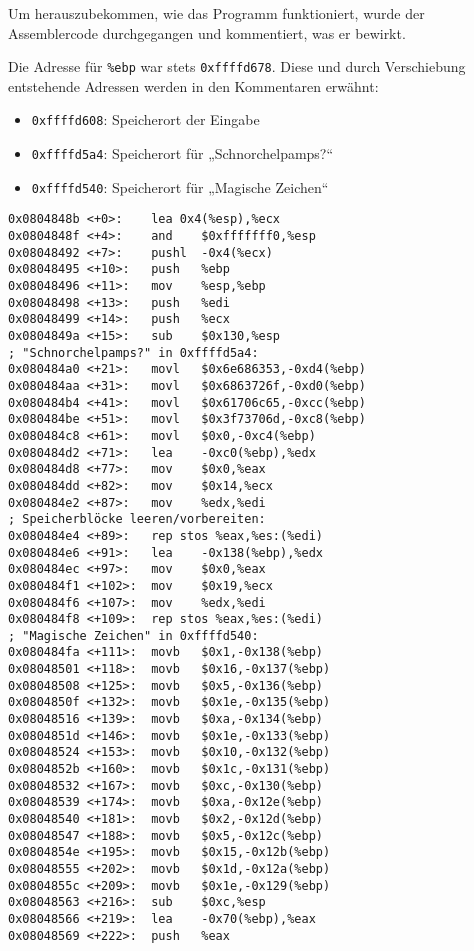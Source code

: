 \documentclass{scrartcl}
\begin{document}
Um herauszubekommen, wie das Programm funktioniert, wurde der Assemblercode durchgegangen und kommentiert, was er bewirkt.

Die Adresse für \lstinline`%ebp` war stets \lstinline`0xffffd678`. Diese und durch Verschiebung entstehende Adressen werden in den Kommentaren erwähnt:
\begin{itemize}
\item \lstinline`0xffffd608`: Speicherort der Eingabe
\item \lstinline`0xffffd5a4`: Speicherort für „Schnorchelpamps?“
\item \lstinline`0xffffd540`: Speicherort für „Magische Zeichen“
\end{itemize}
\begin{lstlisting}[language={[x86masm]Assembler}]
0x0804848b <+0>:	lea 0x4(%esp),%ecx
0x0804848f <+4>:	and    $0xfffffff0,%esp
0x08048492 <+7>:	pushl  -0x4(%ecx)
0x08048495 <+10>:	push   %ebp
0x08048496 <+11>:	mov    %esp,%ebp
0x08048498 <+13>:	push   %edi
0x08048499 <+14>:	push   %ecx
0x0804849a <+15>:	sub    $0x130,%esp
; "Schnorchelpamps?" in 0xffffd5a4:
0x080484a0 <+21>:	movl   $0x6e686353,-0xd4(%ebp)
0x080484aa <+31>:	movl   $0x6863726f,-0xd0(%ebp)
0x080484b4 <+41>:	movl   $0x61706c65,-0xcc(%ebp)
0x080484be <+51>:	movl   $0x3f73706d,-0xc8(%ebp)
0x080484c8 <+61>:	movl   $0x0,-0xc4(%ebp)
0x080484d2 <+71>:	lea    -0xc0(%ebp),%edx
0x080484d8 <+77>:	mov    $0x0,%eax
0x080484dd <+82>:	mov    $0x14,%ecx
0x080484e2 <+87>:	mov    %edx,%edi
; Speicherblöcke leeren/vorbereiten:
0x080484e4 <+89>:	rep stos %eax,%es:(%edi)
0x080484e6 <+91>:	lea    -0x138(%ebp),%edx
0x080484ec <+97>:	mov    $0x0,%eax
0x080484f1 <+102>:	mov    $0x19,%ecx
0x080484f6 <+107>:	mov    %edx,%edi
0x080484f8 <+109>:	rep stos %eax,%es:(%edi)
; "Magische Zeichen" in 0xffffd540:
0x080484fa <+111>:	movb   $0x1,-0x138(%ebp)
0x08048501 <+118>:	movb   $0x16,-0x137(%ebp)
0x08048508 <+125>:	movb   $0x5,-0x136(%ebp)
0x0804850f <+132>:	movb   $0x1e,-0x135(%ebp)
0x08048516 <+139>:	movb   $0xa,-0x134(%ebp)
0x0804851d <+146>:	movb   $0x1e,-0x133(%ebp)
0x08048524 <+153>:	movb   $0x10,-0x132(%ebp)
0x0804852b <+160>:	movb   $0x1c,-0x131(%ebp)
0x08048532 <+167>:	movb   $0xc,-0x130(%ebp)
0x08048539 <+174>:	movb   $0xa,-0x12e(%ebp)
0x08048540 <+181>:	movb   $0x2,-0x12d(%ebp)
0x08048547 <+188>:	movb   $0x5,-0x12c(%ebp)
0x0804854e <+195>:	movb   $0x15,-0x12b(%ebp)
0x08048555 <+202>:	movb   $0x1d,-0x12a(%ebp)
0x0804855c <+209>:	movb   $0x1e,-0x129(%ebp)
0x08048563 <+216>:	sub    $0xc,%esp
0x08048566 <+219>:	lea    -0x70(%ebp),%eax
0x08048569 <+222>:	push   %eax

\end{lstlisting}
\end{document}
